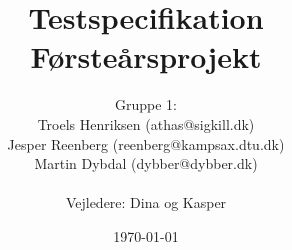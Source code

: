 \documentclass[a4paper,oneside,article, titlepage]{memoir}
\title{Testspecifikation  \\ \small{Førsteårsprojekt}}
\author
{
  Gruppe 1:\\
  Troels Henriksen (athas@sigkill.dk)\\
  Jesper Reenberg (reenberg@kampsax.dtu.dk)\\
  Martin Dybdal (dybber@dybber.dk)\\ \\
  Vejledere: Dina og Kasper
}
\date{\today}
\begin{document}
\maketitle
\tableofcontents*
\newpage









 
\end{document}
